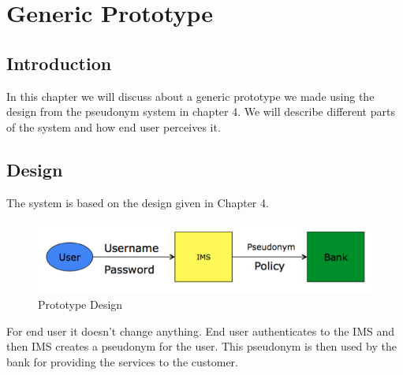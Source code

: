 \chapter{Generic Prototype}
\section{Introduction}
In this chapter we will discuss about a generic prototype we made using the design from the pseudonym system in chapter 4. We will describe different parts of the system and how end user perceives it.
\section{Design}
The system is based on the design given in Chapter 4. 
\begin{figure}[h]
	\centering
	\includegraphics[width=\textwidth]{figures/Pseudonym}
	\caption{Prototype Design}
	\label{fig:Pseudonym}
\end{figure}
For end user it doesn't change anything. End user authenticates to the IMS and then IMS creates a pseudonym for the user. This pseudonym is then used by the bank for providing the services to the customer.
